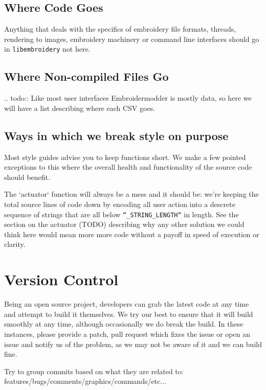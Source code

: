 \documentclass[11pt]{report}
\begin{document}
\subsection{Where Code Goes}

Anything that deals with the specifics of embroidery file formats, threads,
rendering to images, embroidery machinery or command line interfaces should go 
in \texttt{libembroidery} not here.

\subsection{Where Non-compiled Files Go}

.. todo::
   Like most user interfaces Embroidermodder is mostly data,
   so here we will have a list describing where each CSV goes.

\subsection{Ways in which we break style on purpose}

Most style guides advise you to keep functions short. We make a few pointed
exceptions to this where the overall health and functionality of the source code should benefit.

The `actuator` function will always be a mess and it should be: we're keeping
the total source lines of code down by encoding all user action into a descrete
sequence of strings that are all below \texttt{``\_STRING\_LENGTH``} in length. See
the section on the actuator (TODO) describing why any other solution we could
think  here would mean more more code without a payoff in speed of execution or
clarity.

\section{Version Control}

Being an open source project, developers can grab the latest code at any time and attempt to build it themselves. We try our best to ensure that it will build smoothly at any time, although occasionally we do break the build. In these instances, please provide a patch, pull request which fixes the issue or open an issue and notify us of the problem, as we may not be aware of it and we can build fine.

Try to group commits based on what they are related to: features/bugs/comments/graphics/commands/etc...
\end{document}
